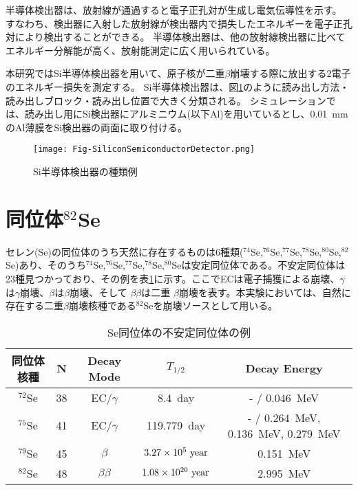 \documentclass[a4paper,10pt]{jreport}
\begin{document}
半導体検出器は、放射線が通過すると電子正孔対が生成し電気伝導性を示す。
すなわち、検出器に入射した放射線が検出器内で損失したエネルギーを電子正孔対により検出することができる。
半導体検出器は、他の放射線検出器に比べてエネルギー分解能が高く、放射能測定に広く用いられている。

本研究ではSi半導体検出器を用いて、原子核が二重$\beta$崩壊する際に放出する2電子のエネルギー損失を測定する。
Si半導体検出器は、図\ref{Fig-SiliconSemiconductorDetector}のように読み出し方法・読み出しブロック・読み出し位置で大きく分類される。
シミュレーションでは、読み出し用にSi検出器にアルミニウム(以下Al)を用いているとし、\SI{0.01}{mm}のAl薄膜をSi検出器の両面に取り付ける。

\begin{figure}[H]
	\center
	\texttt{[image: Fig-SiliconSemiconductorDetector.png]}
	\caption{Si半導体検出器の種類例\cite{hamamatsuHP}} \label{Fig-SiliconSemiconductorDetector}
\end{figure}




\section{同位体$^{82}$Se}

セレン(Se)の同位体のうち天然に存在するものは6種類($^{74}$Se,$^{76}$Se,$^{77}$Se,$^{78}$Se,$^{80}$Se,$^{82}$Se)あり、そのうち$^{74}$Se,$^{76}$Se,$^{77}$Se,$^{78}$Se,$^{80}$Seは安定同位体である。不安定同位体は23種見つかっており、その例を表\ref{Tab-SeIsotope}に示す。ここでECは電子捕獲による崩壊、$\gamma$は$\gamma$崩壊、$\beta$は$\beta$崩壊、そして $\beta\beta$は二重 $\beta$崩壊を表す。本実験においては、自然に存在する二重$\beta$崩壊核種である$^{82}$Seを崩壊ソースとして用いる。

\begin{table}[H] 
	\center
	\caption{Se同位体の不安定同位体の例} \label{Tab-SeIsotope}
	\begin{tabular}{ccccc}
		\hline
		同位体核種 & N & Decay Mode & $T_{1/2}$ & Decay Energy \\
		\hline
		$^{72}$Se & 38 & EC/$\gamma$ & \SI{8.4}{day} & - / \SI{0.046}{MeV} \\
		$^{75}$Se & 41 & EC/$\gamma$ & \SI{119.779}{day}  & - / \SI{0.264}{MeV}, \SI{0.136}{MeV}, \SI{0.279}{MeV} \\
		$^{79}$Se & 45 & $\beta$ & $3.27\times10^{5}\ \rm{year}$ & \SI{0.151}{MeV} \\
		$^{82}$Se & 48 & $\beta\beta$ & $1.08\times10^{20}\ \rm{year}$ & \SI{2.995}{MeV} \\
		\hline
	\end{tabular}
\end{table}
\end{document}
